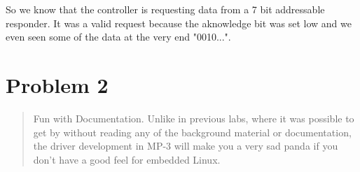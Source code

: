 \documentclass[10pt,a4paper]{article}
\begin{document}
So we know that the controller is requesting data from a 7 bit addressable responder. It was a valid request because the aknowledge bit was set low and we even seen some of the data at the very end "0010...".
 
\section{Problem 2}
\begin{quote}
Fun with Documentation. Unlike in previous labs, where it was possible to get by without reading any of the
background material or documentation, the driver development in MP-3 will make you a very sad panda if you don’t have a good feel for embedded Linux.\\
\end{quote}
\end{document}
